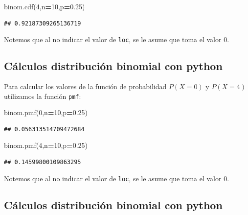 \documentclass[]{book}
\newenvironment{Shaded}{\begin{snugshade}}{\end{snugshade}}
\newcommand{\DecValTok}[1]{\textcolor[rgb]{0.00,0.00,0.81}{#1}}
\newcommand{\FloatTok}[1]{\textcolor[rgb]{0.00,0.00,0.81}{#1}}
\newcommand{\NormalTok}[1]{#1}
\newcommand{\OperatorTok}[1]{\textcolor[rgb]{0.81,0.36,0.00}{\textbf{#1}}}
\begin{document}
\begin{Shaded}
\begin{Highlighting}[]
\NormalTok{binom.cdf(}\DecValTok{4}\NormalTok{,n}\OperatorTok{=}\DecValTok{10}\NormalTok{,p}\OperatorTok{=}\FloatTok{0.25}\NormalTok{)}
\end{Highlighting}
\end{Shaded}

\begin{verbatim}
## 0.92187309265136719
\end{verbatim}

Notemos que al no indicar el valor de \texttt{loc}, se le asume que toma el valor 0.

\hypertarget{cuxe1lculos-distribuciuxf3n-binomial-con-python-2}{%
\subsection{Cálculos distribución binomial con python}\label{cuxe1lculos-distribuciuxf3n-binomial-con-python-2}}

Para calcular los valores de la función de probabilidad \(P(X=0)\) y \(P(X=4)\) utilizamos la función \texttt{pmf}:

\begin{Shaded}
\begin{Highlighting}[]
\NormalTok{binom.pmf(}\DecValTok{0}\NormalTok{,n}\OperatorTok{=}\DecValTok{10}\NormalTok{,p}\OperatorTok{=}\FloatTok{0.25}\NormalTok{)}
\end{Highlighting}
\end{Shaded}

\begin{verbatim}
## 0.056313514709472684
\end{verbatim}

\begin{Shaded}
\begin{Highlighting}[]
\NormalTok{binom.pmf(}\DecValTok{4}\NormalTok{,n}\OperatorTok{=}\DecValTok{10}\NormalTok{,p}\OperatorTok{=}\FloatTok{0.25}\NormalTok{)}
\end{Highlighting}
\end{Shaded}

\begin{verbatim}
## 0.14599800109863295
\end{verbatim}

Notemos que al no indicar el valor de \texttt{loc}, se le asume que toma el valor 0.

\hypertarget{cuxe1lculos-distribuciuxf3n-binomial-con-python-3}{%
\subsection{Cálculos distribución binomial con python}\label{cuxe1lculos-distribuciuxf3n-binomial-con-python-3}}
\end{document}
